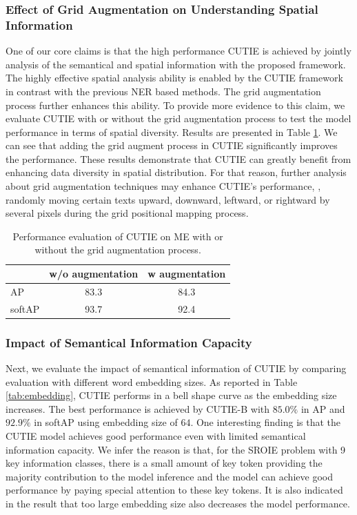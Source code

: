 \documentclass[10pt,twocolumn,letterpaper]{article}
\begin{document}
\subsubsection{Effect of Grid Augmentation on Understanding Spatial Information}
One of our core claims is that the high performance CUTIE is achieved by jointly analysis of the semantical and spatial information with the proposed framework. The highly effective spatial analysis ability is enabled by the CUTIE framework in contrast with the previous NER based methods. The grid augmentation process further enhances this ability. To provide more evidence to this claim, we evaluate CUTIE with or without the grid augmentation process to test the model performance in terms of spatial diversity. Results are presented in Table \ref{tab:augmentation}. We can see that adding the grid augment process in CUTIE significantly improves the performance. These results demonstrate that CUTIE can greatly benefit from enhancing data diversity in spatial distribution. For that reason, further analysis about grid augmentation techniques may enhance CUTIE's performance, \eg, randomly moving certain texts upward, downward, leftward, or rightward by several pixels during the grid positional mapping process. 
\begin{table}
	\caption{Performance evaluation of CUTIE on ME with or without the grid augmentation process.}
\begin{center}
\begin{tabular}{l | c | c}
	 & w/o augmentation & w augmentation \\
	\hline
	AP & 83.3 & 84.3 \\
	softAP & 93.7 & 92.4 \\
\end{tabular}
\end{center}
	\label{tab:augmentation}
\end{table}

\subsubsection{Impact of Semantical Information Capacity}
\label{parameters}
Next, we evaluate the impact of semantical information of CUTIE by comparing evaluation with different word embedding sizes. As reported in Table \ref{tab:embedding}, CUTIE performs in a bell shape curve as the embedding size increases. The best performance is achieved by CUTIE-B with $85.0\%$ in AP and $92.9\%$ in softAP using embedding size of $64$. One interesting finding is that the CUTIE model achieves good performance even with limited semantical information capacity. We infer the reason is that, for the SROIE problem with 9 key information classes, there is a small amount of key token providing the majority contribution to the model inference and the model can achieve good performance by paying special attention to these key tokens. It is also indicated in the result that too large embedding size also decreases the model performance. 
\end{document}

